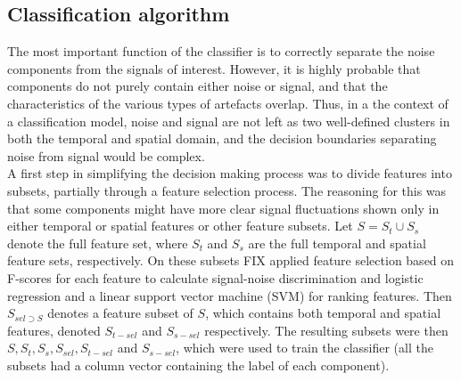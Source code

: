 \subsection{Classification algorithm}

The most important function of the classifier is to correctly separate the noise components from the signals of interest. However, it is highly probable that components do not purely contain either noise or signal, and that the characteristics of the various types of artefacts overlap. Thus, in a the context of a classification model, noise and signal are not left as two well-defined clusters in both the temporal and spatial domain, and the decision boundaries separating noise from signal would be complex. \cite{Salimi-Khorshidi2014} \\
A first step in simplifying the decision making process was to divide features into subsets, partially through a feature selection process. The reasoning for this was that some components might have more clear signal fluctuations shown only in either temporal or spatial features or other feature subsets. Let $S = S_t{\cup}S_s$ denote the full feature set, where $S_t$ and $S_s$ are the full temporal and spatial feature sets, respectively. On these subsets FIX applied feature selection based on F-scores for each feature to calculate signal-noise discrimination and logistic regression and a linear support vector machine (SVM) for ranking features. Then $S_{sel{\supset}S}$ denotes a feature subset of $S$, which contains both temporal and spatial features, denoted $S_{t-sel}$ and $S_{s-sel}$ respectively. The resulting subsets were then $S, S_t, S_s, S_{sel}, S_{t-sel}$ and $S_{s-sel}$, which were used to train the classifier (all the subsets had a column vector containing the label of each component). \\
